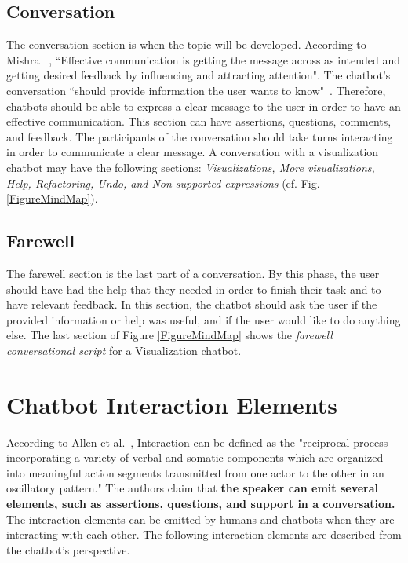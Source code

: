 \documentclass[a4paper,10pt]{article}
\begin{document}
\subsection{Conversation}
The conversation section is when the topic will be developed. According to Mishra ~\cite{effectivCommunication}, ``Effective communication is getting the message across as intended and getting desired feedback by influencing and attracting attention". The chatbot's conversation ``should provide information the user wants to know"~\cite{HowChatbotsCanHelpUsers}. Therefore, chatbots should be able to express a clear message to the user in order to have an effective communication. This section can have assertions, questions, comments, and feedback. The participants of the conversation should take turns interacting in order to communicate a clear message. A conversation with a visualization chatbot may have the following sections: \textit{Visualizations, More visualizations, Help, Refactoring, Undo, and Non-supported expressions} (cf. Fig. \ref{FigureMindMap}).

\subsection{Farewell}
The farewell section is the last part of a conversation. By this phase, the user should have had the help that they needed in order to finish their task and to have relevant feedback. In this section, the chatbot should ask the user if the provided information or help was useful, and if the user would like to do anything else. The last section of Figure \ref{FigureMindMap} shows the \textit{farewell conversational script} for a Visualization chatbot. 

\section{Chatbot Interaction Elements}
According to Allen et al.~\cite{allen1978conversation}, Interaction can be defined as the "reciprocal process incorporating a variety of verbal and somatic components which are organized into meaningful action segments transmitted from one actor to the other in an oscillatory pattern." The authors claim that \textbf{the speaker can emit several elements, such as assertions, questions, and support in a conversation.} The interaction elements can be emitted by humans and chatbots when they are interacting with each other. The following interaction elements are described from the chatbot's perspective. 
\end{document}
